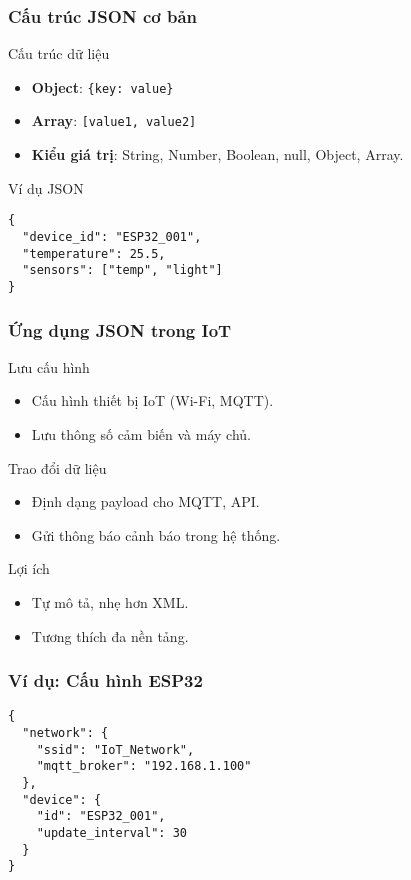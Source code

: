 \begin{frame}[fragile]
\frametitle{Cấu trúc JSON cơ bản}
\begin{block}{Cấu trúc dữ liệu}
\begin{itemize}
\item \textbf{Object}: \texttt{\{key: value\}}
\item \textbf{Array}: \texttt{[value1, value2]}
\item \textbf{Kiểu giá trị}: String, Number, Boolean, null, Object, Array.
\end{itemize}
\end{block}

\begin{exampleblock}{Ví dụ JSON}
\begin{verbatim}
{
  "device_id": "ESP32_001",
  "temperature": 25.5,
  "sensors": ["temp", "light"]
}
\end{verbatim}
\end{exampleblock}
\end{frame}

\begin{frame}
\frametitle{Ứng dụng JSON trong IoT}
\begin{block}{Lưu cấu hình}
\begin{itemize}
\item Cấu hình thiết bị IoT (Wi-Fi, MQTT).
\item Lưu thông số cảm biến và máy chủ.
\end{itemize}
\end{block}

\begin{block}{Trao đổi dữ liệu}
\begin{itemize}
\item Định dạng payload cho MQTT, API.
\item Gửi thông báo cảnh báo trong hệ thống.
\end{itemize}
\end{block}

\begin{block}{Lợi ích}
\begin{itemize}
\item Tự mô tả, nhẹ hơn XML.
\item Tương thích đa nền tảng.
\end{itemize}
\end{block}
\end{frame}

\begin{frame}[fragile]
\frametitle{Ví dụ: Cấu hình ESP32}
\begin{verbatim}
{
  "network": {
    "ssid": "IoT_Network",
    "mqtt_broker": "192.168.1.100"
  },
  "device": {
    "id": "ESP32_001",
    "update_interval": 30
  }
}
\end{verbatim}
\end{frame}

